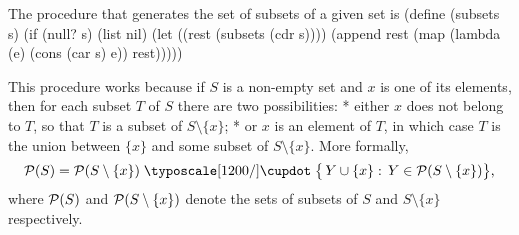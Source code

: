 The procedure that generates the set of subsets of a given set is
\begtt\scm
(define (subsets s)
  (if (null? s)
      (list nil)
      (let ((rest (subsets (cdr s))))
        (append rest (map (lambda (e) (cons (car s) e)) rest)))))
\endtt

This procedure works because if $S$ is a non-empty set and $x$ is one of its elements, then for each subset $T$ of $S$ there are two possibilities:
\begitems
* either $x$ does not belong to $T$, so that $T$ is a subset of $S\setminus\{x\}$;
* or $x$ is an element of $T$, in which case $T$ is the union between $\{x\}$ and some subset of $S\setminus\{x\}$.
\enditems
More formally,
$$
{\cal P}(S) = {\cal P}(S\setminus\{x\})\;\hbox{\typoscale[1200/]$\cupdot$}\;\bigl\{\, Y\cup\{x\} :\, Y\in{\cal P}(S\setminus\{x\}) \bigr\}\hbox{,}
$$
where ${\cal P}(S)$ and ${\cal P}(S\setminus\{x\})$ denote the sets of subsets of $S$ and $S\setminus\{x\}$ respectively.
